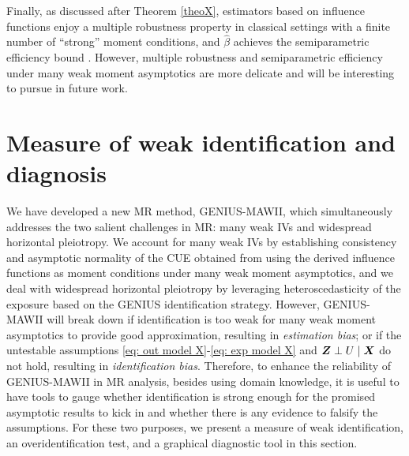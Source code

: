 \documentclass[12pt]{article}
\begin{document}
Finally, as discussed after Theorem \ref{theoX}, estimators based on influence functions enjoy a multiple robustness property in classical settings with a finite number of ``strong'' moment conditions, and    $\hat\beta$ achieves the semiparametric efficiency bound \citep{Ackerberg2014aa}. However, multiple robustness and semiparametric efficiency under many weak moment asymptotics are more delicate and will be interesting to pursue in future work.


\vspace{-5mm}

\section{Measure of weak identification and diagnosis} 
\label{sec: measure}
We have developed a new MR method, GENIUS-MAWII, which simultaneously addresses the two salient challenges in MR:  many weak IVs and widespread horizontal pleiotropy. We account for many weak IVs by establishing consistency and asymptotic normality of the CUE obtained from using the derived influence functions as moment conditions under many weak moment asymptotics, and we deal with widespread horizontal pleiotropy by leveraging heteroscedasticity of the exposure based on the GENIUS identification strategy. However, GENIUS-MAWII will break down if identification is too weak for many weak moment asymptotics to provide good approximation, resulting in  \emph{estimation bias}; or if the untestable assumptions \eqref{eq: out model X}-\eqref{eq: exp model X} and $ \bm{Z}\perp U\mid \bm{X} $ do not hold, resulting in \emph{identification bias}. Therefore, to enhance the reliability of GENIUS-MAWII in MR analysis, besides using domain knowledge, it is useful to have tools to gauge whether identification is strong enough for the promised  asymptotic results to kick in and whether  there is any evidence to falsify the assumptions.  For these two purposes, we present a measure of weak identification, an overidentification test,  and a graphical diagnostic tool in this section. 
\end{document}
